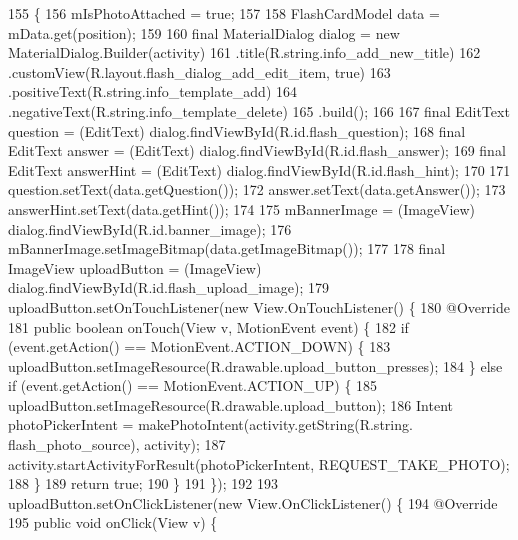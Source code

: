 \begin{DoxyCode}
155                                                                 \{
156         mIsPhotoAttached = \textcolor{keyword}{true};
157 
158         FlashCardModel data = mData.get(position);
159 
160         \textcolor{keyword}{final} MaterialDialog dialog = \textcolor{keyword}{new} MaterialDialog.Builder(activity)
161                 .title(R.string.info\_add\_new\_title)
162                 .customView(R.layout.flash\_dialog\_add\_edit\_item, \textcolor{keyword}{true})
163                 .positiveText(R.string.info\_template\_add)
164                 .negativeText(R.string.info\_template\_delete)
165                 .build();
166 
167         \textcolor{keyword}{final} EditText question = (EditText) dialog.findViewById(R.id.flash\_question);
168         \textcolor{keyword}{final} EditText answer = (EditText) dialog.findViewById(R.id.flash\_answer);
169         \textcolor{keyword}{final} EditText answerHint = (EditText) dialog.findViewById(R.id.flash\_hint);
170 
171         question.setText(data.getQuestion());
172         answer.setText(data.getAnswer());
173         answerHint.setText(data.getHint());
174 
175         mBannerImage = (ImageView) dialog.findViewById(R.id.banner\_image);
176         mBannerImage.setImageBitmap(data.getImageBitmap());
177 
178         \textcolor{keyword}{final} ImageView uploadButton = (ImageView) dialog.findViewById(R.id.flash\_upload\_image);
179         uploadButton.setOnTouchListener(\textcolor{keyword}{new} View.OnTouchListener() \{
180             @Override
181             \textcolor{keyword}{public} \textcolor{keywordtype}{boolean} onTouch(View v, MotionEvent event) \{
182                 \textcolor{keywordflow}{if} (event.getAction() == MotionEvent.ACTION\_DOWN) \{
183                     uploadButton.setImageResource(R.drawable.upload\_button\_presses);
184                 \} \textcolor{keywordflow}{else} \textcolor{keywordflow}{if} (event.getAction() == MotionEvent.ACTION\_UP) \{
185                     uploadButton.setImageResource(R.drawable.upload\_button);
186                     Intent photoPickerIntent = makePhotoIntent(activity.getString(R.string.
      flash\_photo\_source), activity);
187                     activity.startActivityForResult(photoPickerIntent, REQUEST\_TAKE\_PHOTO);
188                 \}
189                 \textcolor{keywordflow}{return} \textcolor{keyword}{true};
190             \}
191         \});
192 
193         uploadButton.setOnClickListener(\textcolor{keyword}{new} View.OnClickListener() \{
194             @Override
195             \textcolor{keyword}{public} \textcolor{keywordtype}{void} onClick(View v) \{

\end{DoxyCode}
